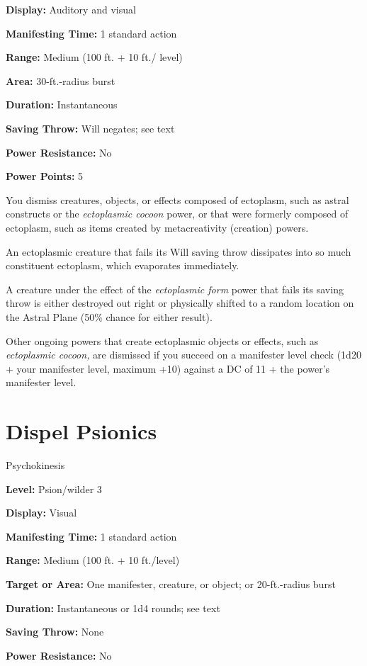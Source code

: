 \documentclass{article}
\begin{document}
\textbf{Display:} Auditory and visual

\textbf{Manifesting Time:} 1 standard action

\textbf{Range:} Medium (100 ft. + 10 ft./ level)

\textbf{Area:} 30-ft.-radius burst

\textbf{Duration:} Instantaneous

\textbf{Saving Throw:} Will negates; see text

\textbf{Power Resistance:} No

\textbf{Power Points:} 5

You dismiss creatures, objects, or effects composed of ectoplasm, such as astral 
constructs or the \textit{ectoplasmic cocoon }power, or that were formerly composed 
of ectoplasm, such as items created by metacreativity (creation) powers.

An ectoplasmic creature that fails its Will saving throw dissipates into so much 
constituent ectoplasm, which evaporates immediately.

A creature under the effect of the \textit{ectoplasmic form }power that fails its 
saving throw is either destroyed out right or physically shifted to a random location 
on the Astral Plane (50\% chance for either result).

Other ongoing powers that create ectoplasmic objects or effects, such as \textit{ectoplasmic 
cocoon, }are dismissed if you succeed on a manifester level check (1d20 + your 
manifester level, maximum +10) against a DC of 11 + the power's manifester level.

\vspace{12pt}
\section*{Dispel Psionics}

Psychokinesis

\textbf{Level:} Psion/wilder 3

\textbf{Display:} Visual

\textbf{Manifesting Time:} 1 standard action

\textbf{Range:} Medium (100 ft. + 10 ft./level)

\textbf{Target or Area:} One manifester, creature, or object; or 20-ft.-radius 
burst

\textbf{Duration:} Instantaneous or 1d4 rounds; see text

\textbf{Saving Throw:} None

\textbf{Power Resistance:} No
\end{document}
